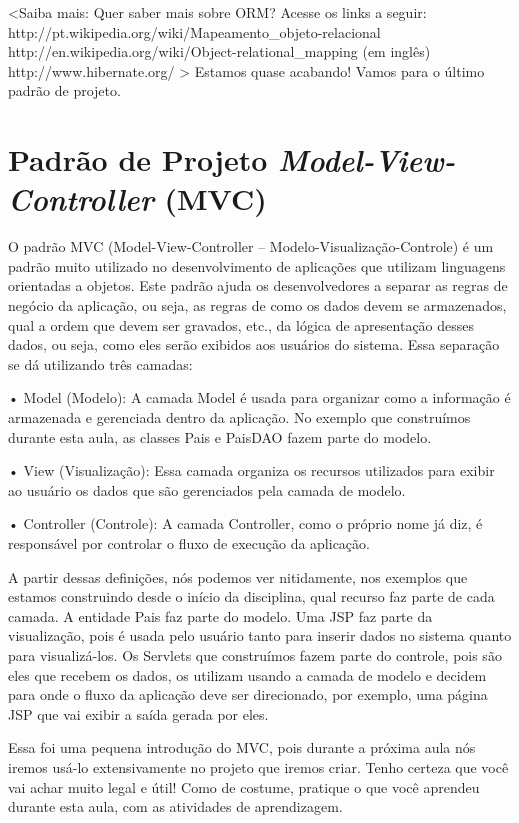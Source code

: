 <Saiba mais:
Quer saber mais sobre ORM? Acesse os links a seguir:
http://pt.wikipedia.org/wiki/Mapeamento\_objeto-relacional
http://en.wikipedia.org/wiki/Object-relational\_mapping (em inglês)
http://www.hibernate.org/
>
Estamos quase acabando! Vamos para o último padrão de projeto.



\section{Padrão de Projeto \textit{Model-View-Controller} (MVC)}


O padrão MVC (Model-View-Controller – Modelo-Visualização-Controle) é um padrão muito utilizado no desenvolvimento de aplicações que utilizam linguagens orientadas a objetos. Este padrão ajuda os desenvolvedores a separar as regras de negócio da aplicação, ou seja, as regras de como os dados devem se armazenados, qual a ordem que devem ser gravados, etc., da lógica de apresentação desses dados, ou seja, como eles serão exibidos aos usuários do sistema. Essa separação se dá utilizando três camadas: 

•	Model (Modelo): A camada Model é usada para organizar como a informação é armazenada e gerenciada dentro da aplicação. No exemplo que construímos durante esta aula, as classes Pais e PaisDAO fazem parte do modelo.

•	View (Visualização): Essa camada organiza os recursos utilizados para exibir ao usuário os dados que são gerenciados pela camada de modelo.

•	Controller (Controle): A camada Controller, como o próprio nome já diz, é responsável por controlar o fluxo de execução da aplicação.

A partir dessas definições, nós podemos ver nitidamente, nos exemplos que estamos construindo desde o início da disciplina, qual recurso faz parte de cada camada. A entidade Pais faz parte do modelo. Uma JSP faz parte da visualização, pois é usada pelo usuário tanto para inserir dados no sistema quanto para visualizá-los. Os Servlets que construímos fazem parte do controle, pois são eles que recebem os dados, os utilizam usando a camada de modelo e decidem para onde o fluxo da aplicação deve ser direcionado, por exemplo, uma página JSP que vai exibir a saída gerada por eles.

Essa foi uma pequena introdução do MVC, pois durante a próxima aula nós iremos usá-lo extensivamente no projeto que iremos criar. Tenho certeza que você vai achar muito legal e útil! Como de costume, pratique o que você aprendeu durante esta aula, com as atividades de aprendizagem.



